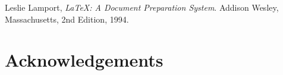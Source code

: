 \documentclass[12pt]{article}%
\begin{document}
\begin{thebibliography}{9}

  Leslie Lamport,
  \emph{\LaTeX: A Document Preparation System}.
  Addison Wesley, Massachusetts,
  2nd Edition,
  1994.
\end{thebibliography}

\section{Acknowledgements}
    
    
\end{document}
